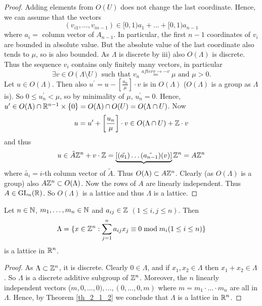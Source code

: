 \documentclass[NumTh.tex]{subfiles}
\begin{document}
\begin{proof}
  Adding elements from $O(U)$ does not change the last coordinate.
  Hence, we can assume that the vectors 
  \[ (v_{i1},\dots,v_{in-1}) \in [0,1)a_1 + \dots + [0,1) a_{n-1} \]
  where $a_i =$ column vector of $A_{n-1}$.
  In particular, the first $n-1$ coordinates of $v_i$ are  bounded in absolute value.
  But the absolute value of the last coordinate also tends to $\mu$, so is also bounded.
  As $\Lambda$ is discrete by iii) also $O(\Lambda)$ is discrete.
  Thus the sequence $v_i$ contains only finitely many vectors, in particular
  \[ \exists v \in O(\Lambda \setminus U) \text{ such that } v_n \overset{after v \to -v}{=} \mu \text{ and } \mu > 0 \text{.}\]
  Let $u \in O(\Lambda)$.
  Then also $u^\prime = u - \left[ \frac{u_n}{\mu} \right] \cdot v$ is in $O(\Lambda)$ ($O(\Lambda)$ is a group as $\Lambda$ is).
  So $0 \leq u_n^\prime < \mu$, so by minimality of $\mu$, $u_n^\prime = 0$.
  Hence, $u^\prime \in O(\Lambda) \cap \mathbb{R}^{n-1} \times \{ 0 \} = O(\Lambda) \cap O(U) = O(\Lambda \cap U)$.
  Now 
  \[ u = u^\prime + \left[ \frac{u_n}{\mu} \right] \cdot v \in O(\Lambda \cap U) + \mathbb{Z} \cdot v\]
  and thus
  \[ u \in \tilde{A} \mathbb{Z}^n + v \cdot \mathbb{Z} = \underbrace{\left[ (\tilde{a_1}) \dots (\tilde{a_{n-1}}) (v)  \right]} \mathbb{Z}^n = A \mathbb{Z}^n \]
  where $\tilde{a_i} = i$-th column vector of $\tilde{A}$.
  Thus $O(\Lambda) \subset A \mathbb{Z}^n$.
  Clearly (as $O(\Lambda)$ is a group) also $A \mathbb{Z}^n \subset O(\Lambda)$.
  Now the rows of $A$ are linearly independent.
  Thus $A \in \operatorname{GL}_n(\mathbb{R})$.
  So $O(\Lambda)$ is a lattice and thus $\Lambda$ is a lattice.
\end{proof}

\begin{cor}
  Let $n \in \mathbb{N}$, $m_1,\dots,m_n \in \mathbb{N}$ and $a_{ij} \in \mathbb{Z}$ $(1\leq i,j \leq n)$.
  Then 
  \[ \Lambda = \{ x \in \mathbb{Z}^n : \sum_{j=1}^n a_{ij} x_j \equiv 0 \bmod m_i (1 \leq i \leq n) \} \]
  is a lattice in $\mathbb{R}^n$.
\end{cor}

\begin{proof}
  As $\Lambda \subset \mathbb{Z}^n$, it is discrete. Clearly $0 \in \Lambda$, and if $x_1,x_2 \in \Lambda$ then $x_1 + x_2 \in \Lambda$.
  So $\Lambda$ is a discrete additive subgroup of $\mathbb{Z}^n$.
  Moreover, the $n$ linearly independent vectors ($m,0,\dots,0),\dots,(0,\dots,0,m)$ where $m = m_1 \cdot \dots \cdot m_n$
  are all in $\Lambda$.
  Hence, by Theorem \ref{th_2_1_2} we conclude that $\Lambda$ is a lattice in $\mathbb{R}^n$.
\end{proof}
\end{document}
